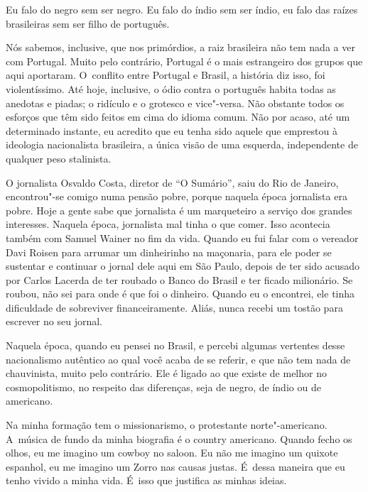 Eu falo do negro sem ser negro. Eu falo do índio sem ser índio, eu falo
das raízes brasileiras sem ser filho de português.

 

Nós sabemos, inclusive, que nos primórdios, a raiz brasileira não tem
nada a ver com Portugal. Muito pelo contrário, Portugal é o mais
estrangeiro dos grupos que aqui aportaram. O~conflito entre Portugal e
Brasil, a história diz isso, foi violentíssimo. Até hoje, inclusive, o
ódio contra o português habita todas as anedotas e piadas; o ridículo e
o grotesco e vice"-versa. Não obstante todos os esforços que têm sido
feitos em cima do idioma comum. Não por acaso, até um determinado
instante, eu acredito que eu tenha sido aquele que emprestou à ideologia
nacionalista brasileira, a única visão de uma esquerda, independente de
qualquer peso stalinista.

 

O jornalista Osvaldo Costa, diretor de ``O Sumário'', saiu do Rio de
Janeiro, encontrou"-se comigo numa pensão pobre, porque naquela época
jornalista era pobre. Hoje a gente sabe que jornalista é um marqueteiro
a serviço dos grandes interesses. Naquela época, jornalista mal tinha o
que comer. Isso acontecia também com Samuel Wainer no fim da vida.
Quando eu fui falar com o vereador Davi Roisen para arrumar um
dinheirinho na maçonaria, para ele poder se sustentar e continuar o
jornal dele aqui em São Paulo, depois de ter sido acusado por
Carlos Lacerda de ter roubado o Banco do Brasil e ter ficado milionário.
Se roubou, não sei para onde é que foi o dinheiro. Quando eu o
encontrei, ele tinha dificuldade de sobreviver financeiramente. Aliás,
nunca recebi um tostão para escrever no seu jornal.

 

Naquela época, quando eu pensei no Brasil, e percebi algumas vertentes
desse nacionalismo autêntico ao qual você acaba de se referir, e que não
tem nada de chauvinista, muito pelo contrário. Ele é ligado ao que
existe de melhor no cosmopolitismo, no respeito das diferenças, seja de
negro, de índio ou de americano.

 

Na minha formação tem o missionarismo, o protestante norte"-americano. A~música de fundo da minha biografia é o country americano. Quando fecho
os olhos, eu me imagino um cowboy no saloon. Eu não me imagino um quixote
espanhol, eu me imagino um Zorro nas causas justas. É~dessa maneira que
eu tenho vivido a minha vida. É~isso que justifica as minhas ideias.

